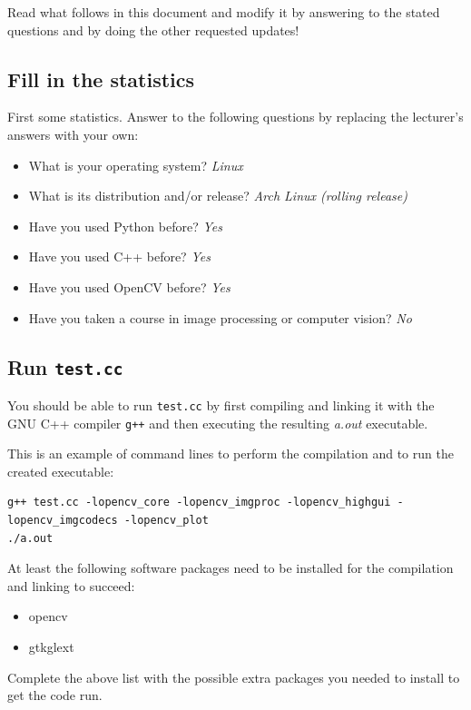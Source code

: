\documentclass{article}
\begin{document}
Read what follows in this document and modify it by answering to the
stated questions and by doing the other requested updates!


\subsection{Fill in the statistics}

First some statistics.  Answer to the following questions by replacing
the lecturer's answers with your own:

\begin{itemize}
\item What is your operating system? \emph{Linux}
\item What is its distribution and/or release? \emph{Arch Linux (rolling release)}
\item Have you used Python before? \emph{Yes}
\item Have you used C++ before? \emph{Yes}
\item Have you used OpenCV before? \emph{Yes}
\item Have you taken a course in image processing or computer vision? \emph{No}
\end{itemize}


\subsection{Run \texttt{test.cc}}

You should be able to run \texttt{test.cc} by first compiling and
linking it with the GNU C++ compiler \texttt{g++} and then executing
the resulting \emph{a.out} executable.

This is an example of command lines to perform the compilation and to
run the created executable:

{\small
\begin{verbatim}
g++ test.cc -lopencv_core -lopencv_imgproc -lopencv_highgui -lopencv_imgcodecs -lopencv_plot
./a.out
\end{verbatim}
}

At least the following software packages need to be installed for the
compilation and linking to succeed:

\begin{itemize}
\item opencv
\item gtkglext
\end{itemize}

Complete the above list with the possible extra packages you needed
to install to get the code run.
\end{document}

